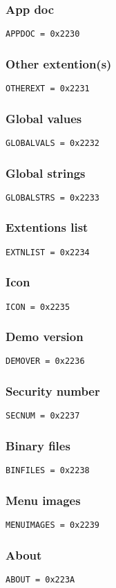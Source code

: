 \documentclass{article}
\begin{document}
\subsubsection{App doc}
\verb|APPDOC = 0x2230|

\subsubsection{Other extention(s)}
\verb|OTHEREXT = 0x2231|

\subsubsection{Global values}
\verb|GLOBALVALS = 0x2232|

\subsubsection{Global strings}
\verb|GLOBALSTRS = 0x2233|

\subsubsection{Extentions list}
\verb|EXTNLIST = 0x2234|

\subsubsection{Icon}
\verb|ICON = 0x2235|

\subsubsection{Demo version}
\verb|DEMOVER = 0x2236|

\subsubsection{Security number}
\verb|SECNUM = 0x2237|

\subsubsection{Binary files}
\verb|BINFILES = 0x2238|

\subsubsection{Menu images}
\verb|MENUIMAGES = 0x2239|

\subsubsection{About}
\verb|ABOUT = 0x223A|
\end{document}

